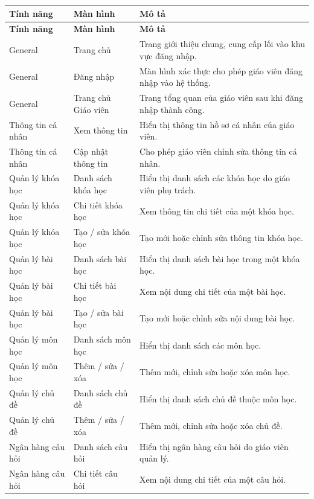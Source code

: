 \documentclass[12pt,a4paper,oneside]{report}
\begin{document}
\renewcommand{\arraystretch}{1.12}
\begin{longtable}{|p{3.0cm}|p{4.1cm}|p{7.0cm}|}
\hline
\rowcolor{orange!15}
\textbf{Tính năng} & \textbf{Màn hình} & \textbf{Mô tả} \\ \hline
\endfirsthead
\hline
\rowcolor{orange!15}
\textbf{Tính năng} & \textbf{Màn hình} & \textbf{Mô tả} \\ \hline
\endhead
General & Trang chủ & Trang giới thiệu chung, cung cấp lối vào khu vực đăng nhập. \\ \hline
General & Đăng nhập & Màn hình xác thực cho phép giáo viên đăng nhập vào hệ thống. \\ \hline
General & Trang chủ Giáo viên & Trang tổng quan của giáo viên sau khi đăng nhập thành công. \\ \hline
Thông tin cá nhân & Xem thông tin & Hiển thị thông tin hồ sơ cá nhân của giáo viên. \\ \hline
Thông tin cá nhân & Cập nhật thông tin & Cho phép giáo viên chỉnh sửa thông tin cá nhân. \\ \hline
Quản lý khóa học & Danh sách khóa học & Hiển thị danh sách các khóa học do giáo viên phụ trách. \\ \hline
Quản lý khóa học & Chi tiết khóa học & Xem thông tin chi tiết của một khóa học. \\ \hline
Quản lý khóa học & Tạo / sửa khóa học & Tạo mới hoặc chỉnh sửa thông tin khóa học. \\ \hline
Quản lý bài học & Danh sách bài học & Hiển thị danh sách bài học trong một khóa học. \\ \hline
Quản lý bài học & Chi tiết bài học & Xem nội dung chi tiết của một bài học. \\ \hline
Quản lý bài học & Tạo / sửa bài học & Tạo mới hoặc chỉnh sửa nội dung bài học. \\ \hline
Quản lý môn học & Danh sách môn học & Hiển thị danh sách các môn học. \\ \hline
Quản lý môn học & Thêm / sửa / xóa & Thêm mới, chỉnh sửa hoặc xóa môn học. \\ \hline
Quản lý chủ đề & Danh sách chủ đề & Hiển thị danh sách chủ đề thuộc môn học. \\ \hline
Quản lý chủ đề & Thêm / sửa / xóa & Thêm mới, chỉnh sửa hoặc xóa chủ đề. \\ \hline
Ngân hàng câu hỏi & Danh sách câu hỏi & Hiển thị ngân hàng câu hỏi do giáo viên quản lý. \\ \hline
Ngân hàng câu hỏi & Chi tiết câu hỏi & Xem nội dung chi tiết của một câu hỏi. \\ \hline

\end{longtable}
\end{document}
